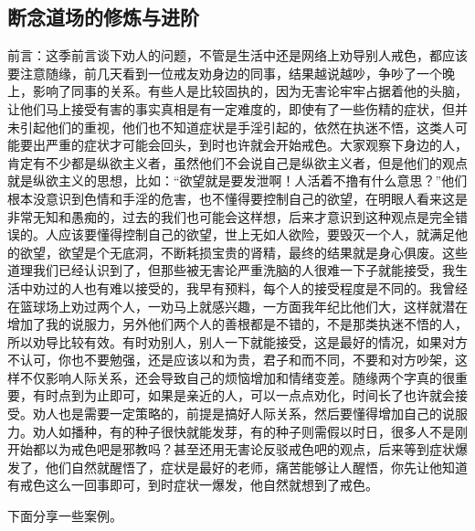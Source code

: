 \subsection{断念道场的修炼与进阶}

前言：这季前言谈下劝人的问题，不管是生活中还是网络上劝导别人戒色，都应该要注意随缘，前几天看到一位戒友劝身边的同事，结果越说越吵，争吵了一个晚上，影响了同事的关系。有些人是比较固执的，因为无害论牢牢占据着他的头脑，让他们马上接受有害的事实真相是有一定难度的，即使有了一些伤精的症状，但并未引起他们的重视，他们也不知道症状是手淫引起的，依然在执迷不悟，这类人可能要出严重的症状才可能会回头，到时也许就会开始戒色。大家观察下身边的人，肯定有不少都是纵欲主义者，虽然他们不会说自己是纵欲主义者，但是他们的观点就是纵欲主义的思想，比如：“欲望就是要发泄啊！人活着不撸有什么意思？”他们根本没意识到色情和手淫的危害，也不懂得要控制自己的欲望，在明眼人看来这是非常无知和愚痴的，过去的我们也可能会这样想，后来才意识到这种观点是完全错误的。人应该要懂得控制自己的欲望，世上无如人欲险，要毁灭一个人，就满足他的欲望，欲望是个无底洞，不断耗损宝贵的肾精，最终的结果就是身心俱废。这些道理我们已经认识到了，但那些被无害论严重洗脑的人很难一下子就能接受，我生活中劝过的人也有难以接受的，我早有预料，每个人的接受程度是不同的。我曾经在篮球场上劝过两个人，一劝马上就感兴趣，一方面我年纪比他们大，这样就潜在增加了我的说服力，另外他们两个人的善根都是不错的，不是那类执迷不悟的人，所以劝导比较有效。有时劝别人，别人一下就能接受，这是最好的情况，如果对方不认可，你也不要勉强，还是应该以和为贵，君子和而不同，不要和对方吵架，这样不仅影响人际关系，还会导致自己的烦恼增加和情绪变差。随缘两个字真的很重要，有时点到为止即可，如果是亲近的人，可以一点点劝化，时间长了也许就会接受。劝人也是需要一定策略的，前提是搞好人际关系，然后要懂得增加自己的说服力。劝人如播种，有的种子很快就能发芽，有的种子则需假以时日，很多人不是刚开始都以为戒色吧是邪教吗？甚至还用无害论反驳戒色吧的观点，后来等到症状爆发了，他们自然就醒悟了，症状是最好的老师，痛苦能够让人醒悟，你先让他知道有戒色这么一回事即可，到时症状一爆发，他自然就想到了戒色。

下面分享一些案例。

